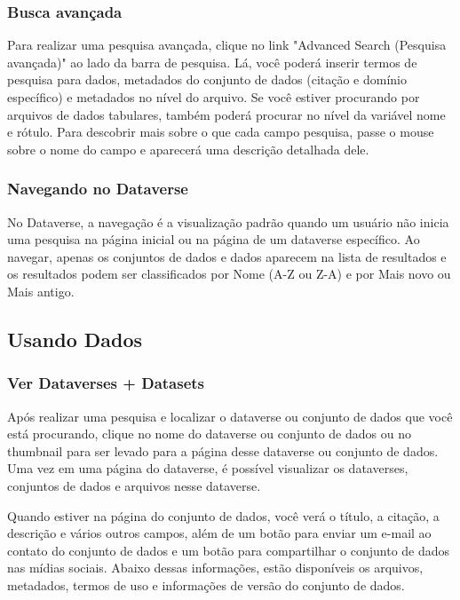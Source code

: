 \documentclass[12pt,hidelinks]{article}
\begin{document}
	    \subsubsection{Busca avançada}
	    
\qquad Para realizar uma pesquisa avançada, clique no link "Advanced Search (Pesquisa avançada)" ao lado da barra de pesquisa. Lá, você poderá inserir termos de pesquisa para dados, metadados do conjunto de dados (citação e domínio específico) e metadados no nível do arquivo. Se você estiver procurando por arquivos de dados tabulares, também poderá procurar no nível da variável nome e rótulo. Para descobrir mais sobre o que cada campo pesquisa, passe o mouse sobre o nome do campo e aparecerá uma descrição detalhada dele.
	    
	    \subsubsection{Navegando no Dataverse}
	    
\qquad No Dataverse, a navegação é a visualização padrão quando um usuário não inicia uma pesquisa na página inicial ou na página de um dataverse específico. Ao navegar, apenas os conjuntos de dados e dados aparecem na lista de resultados e os resultados podem ser classificados por Nome (A-Z ou Z-A) e por Mais novo ou Mais antigo.
	    
	\subsection{Usando Dados}
	
	    \subsubsection{Ver Dataverses + Datasets}
	    
\qquad Após realizar uma pesquisa e localizar o dataverse ou conjunto de dados que você está procurando, clique no nome do dataverse ou conjunto de dados ou no thumbnail para ser levado para a página desse dataverse ou conjunto de dados. Uma vez em uma página do dataverse, é possível visualizar os dataverses, conjuntos de dados e arquivos nesse dataverse.

Quando estiver na página do conjunto de dados, você verá o título, a citação, a descrição e vários outros campos, além de um botão para enviar um e-mail ao contato do conjunto de dados e um botão para compartilhar o conjunto de dados nas mídias sociais. Abaixo dessas informações, estão disponíveis os arquivos, metadados, termos de uso e informações de versão do conjunto de dados.
	    
\end{document}

